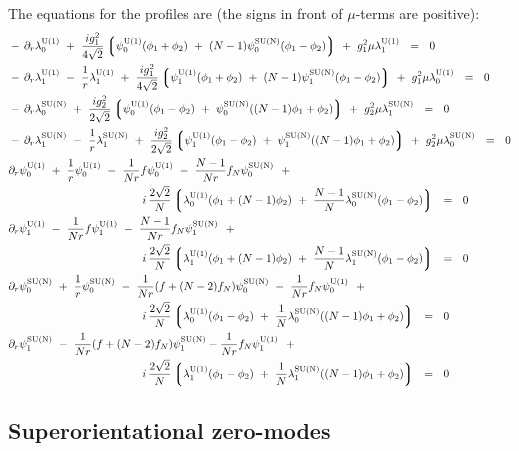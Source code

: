 \documentclass{article}
\newcommand{\p}{\partial}
\newcommand{\lgr}{\left\lgroup}
\newcommand{\rgr}{\right\rgroup}
\begin{document}
The equations for the profiles are (the signs in front of $\mu$-terms are positive):
\begin{align}
%
\notag
&
	-\, \p_r \loU ~+~ \frac{i g_1^2}{4\sqrt{2}} 
			\lgr \poU (\phi_1 + \phi_2) ~+~ (N-1) \poN (\phi_1 - \phi_2) \rgr 
				~+~ g_1^2 \mu \llU    ~~=~~ 0
	\\
%
\notag
&
	-\, \p_r \llU ~-~ \frac{1}{r}\llU 
	~+~ \frac{i g_1^2}{4\sqrt{2}} 
	    \lgr \plU (\phi_1 + \phi_2) ~+~ (N-1) \plN (\phi_1 - \phi_2) \rgr 
	~+~ g_1^2 \mu \loU ~~=~~ 0
	\\
%
\notag
&
	-\, \p_r \loN ~+~ 
	\frac{i g_2^2}{2\sqrt{2}}
		\lgr \poU (\phi_1 - \phi_2) ~+~ \poN ( (N-1) \phi_1 + \phi_2 ) \rgr 
	~+~ g_2^2 \mu \llN ~~=~~ 0
	\\
%
\notag
&
	-\, \p_r \llN ~-~ \frac{1}{r}\llN
	~+~ \frac{i g_2^2}{2\sqrt{2}} 
		\lgr \plU (\phi_1 - \phi_2) ~+~ \plN ( (N-1) \phi_1 + \phi_2 ) \rgr
	~+~ g_2^2 \mu \loN ~~=~~ 0
	\\
%
\notag
&
	\p_r \poU ~+~ \frac{1}{r} \poU ~-~ \frac{1}{Nr}f \poU ~-~ \frac{N-1}{Nr} f_N \poN 
	~~+~~  \\
&\notag
\qquad\qquad\qquad\qquad\qquad\qquad
	i\, \frac{2\sqrt{2}}{N} 
		\lgr  \loU (\phi_1 + (N-1)\phi_2) ~+~ \frac{N-1}{N} \loN (\phi_1 - \phi_2) \rgr 
		~~=~~ 0
	\\
%
&
\label{N1_strans_eqn}
	\p_r \plU ~-~ \frac{1}{Nr}f \plU ~-~ \frac{N-1}{Nr} f_N \plN 
	~~+~~ \\
&\notag
\qquad\qquad\qquad\qquad\qquad\qquad
	i\, \frac{2\sqrt{2}}{N}
		\lgr \llU (\phi_1 + (N-1) \phi_2) ~+~ \frac{N-1}{N} \llN (\phi_1 - \phi_2) \rgr
		~~=~~ 0
	\\
%
&
\notag
	\p_r \poN ~+~ \frac{1}{r} \poN ~-~ \frac{1}{Nr} (f + (N-2)f_N) \poN ~-~
			\frac{1}{Nr} f_N \poU 
	~~+~~ \\
&\notag
\qquad\qquad\qquad\qquad\qquad\qquad
	i\, \frac{2\sqrt{2}}{N} 
		\lgr \loU (\phi_1 - \phi_2) ~+~ \frac{1}{N} \loN ((N-1)\phi_1 + \phi_2) \rgr
		~~=~~ 0
	\\
%
&
\notag
	\p_r \plN ~-~ \frac{1}{Nr} (f + (N-2)f_N) \plN - \frac{1}{Nr} f_N \plU 
	~~+~~  \\
&\notag
\qquad\qquad\qquad\qquad\qquad\qquad
	i\, \frac{2\sqrt{2}}{N}
		\lgr \llU (\phi_1 - \phi_2) ~+~ \frac{1}{N} \llN ((N-1)\phi_1 + \phi_2) \rgr
		~~=~~ 0
\end{align}


\pagebreak
\subsection{Superorientational zero-modes}
\end{document}
